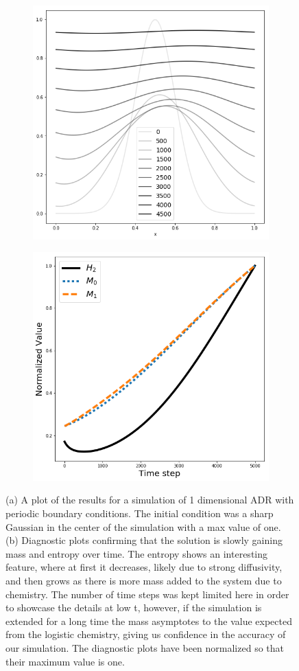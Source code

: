 \documentclass[]{article}
\begin{document}
\begin{figure}
	\begin{subfigure}{.5\textwidth}
		\centering
		\includegraphics[width=.8\linewidth]{figures/1D_ADR.png}
		\caption{}
	\end{subfigure}%
	\begin{subfigure}{.5\textwidth}
		\centering
		\includegraphics[width=.8\linewidth]{figures/1D_ADR_diag.png}
		\caption{}
	\end{subfigure}
	\caption{(a) A plot of the results for a simulation of 1 dimensional ADR with periodic boundary conditions. The initial condition was a sharp Gaussian in the center of the simulation with a max value of one. (b) Diagnostic plots confirming that the solution is slowly gaining mass and entropy over time. The entropy shows an interesting feature, where at first it decreases, likely due to strong diffusivity, and then grows as there is more mass added to the system due to chemistry. The number of time steps was kept limited here in order to showcase the details at low t, however, if the simulation is extended for a long time the mass asymptotes to the value expected from the logistic chemistry, giving us confidence in the accuracy of our simulation. The diagnostic plots have been normalized so that their maximum value is one.}
	\label{fig:1D_ADR}
\end{figure}
\end{document}
